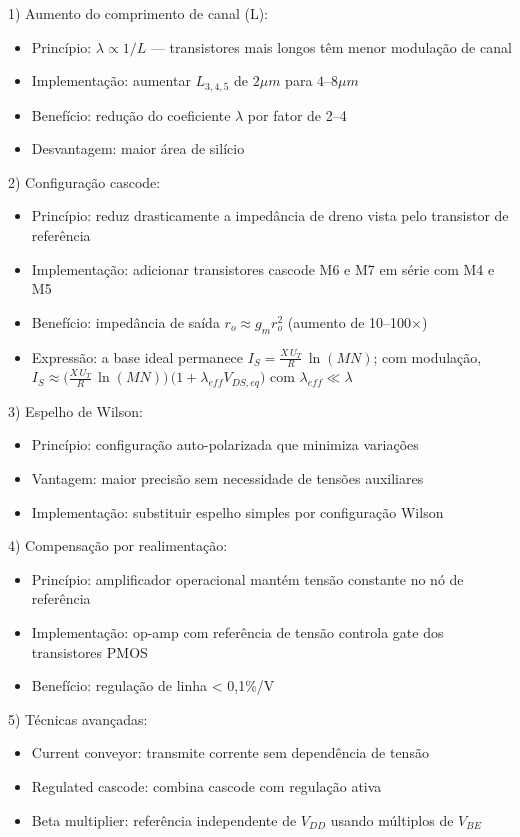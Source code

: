 ﻿\documentclass[12pt,a4paper]{article}
\begin{document}
1) Aumento do comprimento de canal (L):
\begin{itemize}
    \item Princípio: $\lambda \propto 1/L$ — transistores mais longos têm menor modulação de canal
    \item Implementação: aumentar $L_{3,4,5}$ de $2\mu m$ para $4$–$8\mu m$
    \item Benefício: redução do coeficiente $\lambda$ por fator de 2–4
    \item Desvantagem: maior área de silício
\end{itemize}

2) Configuração cascode:
\begin{itemize}
    \item Princípio: reduz drasticamente a impedância de dreno vista pelo transistor de referência
    \item Implementação: adicionar transistores cascode M6 e M7 em série com M4 e M5
    \item Benefício: impedância de saída $r_o \approx g_m r_o^2$ (aumento de 10–100×)
    \item Expressão: a base ideal permanece $I_S = \tfrac{X\,U_T}{R}\,\ln(MN)$; com modulação, $I_S \approx \big(\tfrac{X\,U_T}{R}\,\ln(MN)\big)\,\big(1 + \lambda_{eff} V_{DS,eq}\big)$ com $\lambda_{eff} \ll \lambda$
\end{itemize}

3) Espelho de Wilson:
\begin{itemize}
    \item Princípio: configuração auto-polarizada que minimiza variações
    \item Vantagem: maior precisão sem necessidade de tensões auxiliares
    \item Implementação: substituir espelho simples por configuração Wilson
\end{itemize}

4) Compensação por realimentação:
\begin{itemize}
    \item Princípio: amplificador operacional mantém tensão constante no nó de referência
    \item Implementação: op-amp com referência de tensão controla gate dos transistores PMOS
    \item Benefício: regulação de linha < 0,1\%/V
\end{itemize}

5) Técnicas avançadas:
\begin{itemize}
    \item Current conveyor: transmite corrente sem dependência de tensão
    \item Regulated cascode: combina cascode com regulação ativa
    \item Beta multiplier: referência independente de $V_{DD}$ usando múltiplos de $V_{BE}$
\end{itemize}
\end{document}
